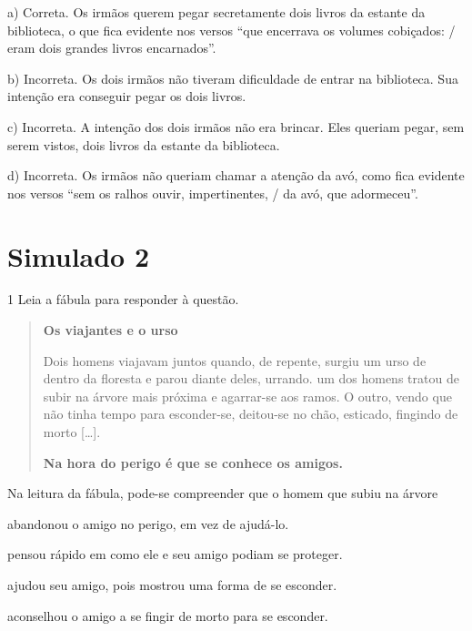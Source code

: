 
a) Correta. Os irmãos querem pegar secretamente dois livros da estante da
biblioteca, o que fica evidente nos versos ``que encerrava os volumes
cobiçados: / eram dois grandes livros encarnados''. 

b) Incorreta. Os dois irmãos não tiveram dificuldade de entrar na 
biblioteca. Sua intenção era conseguir pegar os dois livros.

c) Incorreta. A intenção dos dois irmãos não era brincar. Eles queriam
pegar, sem serem vistos, dois livros da estante da biblioteca. 

d)  Incorreta. Os irmãos não queriam chamar a atenção da avó, como fica 
evidente nos versos ``sem os ralhos ouvir, impertinentes, / da avó, que
adormeceu''.

\chapter{Simulado 2}

\num{1} Leia a fábula para responder à questão.

\begin{quote}
\textbf{Os viajantes e o urso}

Dois homens viajavam juntos quando, de repente, surgiu um urso de dentro
da floresta e parou diante deles, urrando. um dos homens tratou de subir
na árvore mais próxima e agarrar-se aos ramos. O outro, vendo que não
tinha tempo para esconder-se, deitou-se no chão, esticado, fingindo de
morto {[}\ldots{}{]}.

\textbf{Na hora do perigo é que se conhece os amigos.}

\end{quote}

Na leitura da fábula, pode-se compreender que o homem que subiu na árvore

\begin{escolha}
\item abandonou o amigo no perigo, em vez de ajudá-lo.

\item pensou rápido em como ele e seu amigo podiam se proteger.

\item ajudou seu amigo, pois mostrou uma forma de se esconder.

\item aconselhou o amigo a se fingir de morto para se esconder.
\end{escolha}

